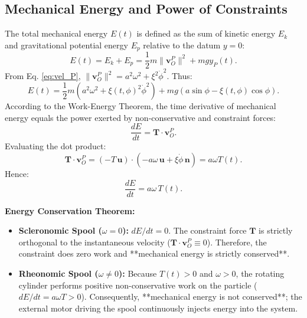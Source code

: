 \documentclass[11pt,a4paper]{article}
\begin{document}
\subsection{Mechanical Energy and Power of Constraints}
The total mechanical energy $E(t)$ is defined as the sum of kinetic energy $E_k$ and gravitational potential energy $E_p$ relative to the datum $y = 0$:
\begin{equation}
    E(t) = E_k + E_p = \frac{1}{2}m\|\mathbf{v}_O^P\|^2 + m g y_P(t).
\end{equation}
From Eq. \eqref{eq:vel_P}, $\|\mathbf{v}_O^P\|^2 = a^2\omega^2 + \xi^2\dot{\phi}^2$. Thus:
\begin{equation}
    \label{eq:energy_expr}
    E(t) = \frac{1}{2}m\left(a^2\omega^2 + \xi(t, \phi)^2\dot{\phi}^2\right) + m g\left(a\sin\phi - \xi(t, \phi)\cos\phi\right).
\end{equation}
According to the Work-Energy Theorem, the time derivative of mechanical energy equals the power exerted by non-conservative and constraint forces:
\begin{equation}
    \frac{dE}{dt} = \mathbf{T} \cdot \mathbf{v}_O^P.
\end{equation}
Evaluating the dot product:
\begin{equation}
    \mathbf{T} \cdot \mathbf{v}_O^P = \left(-T\,\mathbf{u}\right) \cdot \left(-a\omega\,\mathbf{u} + \xi\dot{\phi}\,\mathbf{n}\right) = a\omega T(t).
\end{equation}
Hence:
\begin{equation}
    \label{eq:dE_dt}
    \frac{dE}{dt} = a\omega\,T(t).
\end{equation}

\noindent\textbf{Energy Conservation Theorem:}
\begin{itemize}
    \item \textbf{Scleronomic Spool ($\omega = 0$):} $dE/dt = 0$. The constraint force $\mathbf{T}$ is strictly orthogonal to the instantaneous velocity ($\mathbf{T} \cdot \mathbf{v}_O^P \equiv 0$). Therefore, the constraint does zero work and **mechanical energy is strictly conserved**.
    \item \textbf{Rheonomic Spool ($\omega \neq 0$):} Because $T(t) > 0$ and $\omega > 0$, the rotating cylinder performs positive non-conservative work on the particle ($dE/dt = a\omega T > 0$). Consequently, **mechanical energy is not conserved**; the external motor driving the spool continuously injects energy into the system.
\end{itemize}
\end{document}
